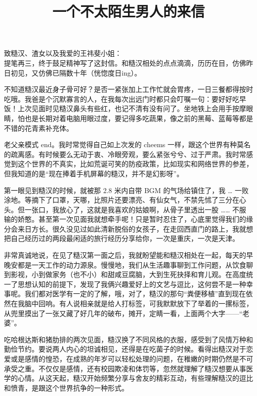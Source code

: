 \documentclass[a4paper, zihao=-4, utf8]{ctexart}
\title{一个不太陌生男人的来信}
\date{}
\newcommand{\NotoLight}{\CJKfamily{NotoLight}}
\begin{document}
\maketitle

\noindent 致糙汉、渣女以及我爱的{\NotoLight 王祎斐}小姐：\\

提笔再三，终于鼓足精神写了这封信。和糙汉相处的点点滴滴，历历在目，仿佛昨日初见，又仿佛已隔数十年（恍惚度日ing）。

不知道糙汉最近身子骨可好？是否一紧张加上工作忙就会胃疼，一日三餐都得按时吃哦。我爸是个沉默寡言的人，在我每次出远门时都只会叮嘱一句：要好好吃早饭！上次见面时见糙汉鼻头有些红，也记不清有没有问了。坐地铁上会用手按摩眼睛，怕也是长期对着电脑用眼过度，要记得多吃蔬果，像之前的黑莓、蓝莓等都是不错的花青素补充体。

老父亲模式 end。我时常觉得自己如上次发的 cheems 一样，跟这个世界有种莫名的疏离感。有时候要么无动于衷、冷眼旁观，要么紧张兮兮、过于严肃。我时常感觉到这个世界的不真实，比如荒诞可笑的防疫政策，比如现实和网络世界的参差，但我知道的是“现在捧着手机屏幕的糙汉，并不是幻影呀”。

第一眼见到糙汉的时候，就被那 2.8 米内自带 BGM 的气场给镇住了，我 … 一败涂地。等摘下了口罩，天哪，比照片还要漂亮、有仙女气，不禁先怵了三分在心头。但一张口，我放心了，这就是我喜欢的姑娘啊，从骨子里透出一股 …… 不服输的娇憨。甚至第一次见面我就想牵手呢！只是暂时忍住了，心底里觉得我们的缘分会来日方长。很久没见过如此清新脱俗的女孩子，在走回西直门的路上，我就想把自己经历过的两段最闲适的旅行经历分享给你，一次是重庆，一次是天津。

非常真诚地说，在见了糙汉第一面之后，我就盼望能和糙汉相处在一起，每天的早晚安都是一天工作的动力源泉。慢慢地，我们从生活趣事聊到工作问题，从饮食聊到影视，小到做家务（也不小）和甜咸豆腐脑，大到生死抉择和育儿观。在高度统一了思想认知的前提下，发现了我俩兴趣爱好上的文艺与逗比，这何尝不是一种幸事呢。我们都对医学有一定的了解，哦，对了，糙汉的那句“粪便移植”直到现在依然在我脑中回响。有人说相亲就是给人打标签，可我默默放下了举着的一摞标签，从兜里摸出了一张又藏了好几年的破布，摊开，定睛一看，上面两个大字——“老婆”。

吃哈根达斯和猪肋排的两次见面，糙汉换了不同风格的衣服，感受到了风情万种和勤俭节约。要说两人内心的坦诚相见，还得是在吃菌子的时候。看得出糙汉对于恋爱或是感情的惶恐，在成熟的年岁可以轻松处理的问题，在稚嫩的时期仍然是不可承受之重。不仅仅是感情，还有校园欺凌和体罚等，忽然就理解了糙汉想要从事医学的心情。从这天起，糙汉开始频繁分享与舍友的精彩互动，有些理解糙汉的逗比和愤青，是跟这个世界抗争的一种形式。
\end{document}
